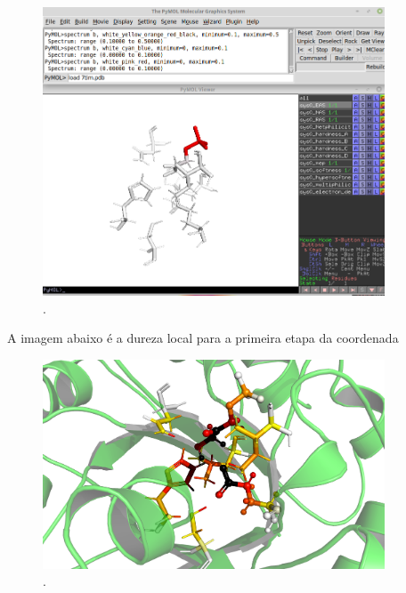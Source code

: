 \documentclass[a4paper,11pt]{refart}
\begin{document}
\hspace*{-\leftmarginwidth}
\begin{minipage}{\fullwidth}
	\begin{figure}[H]
		\begin{center}
			\includegraphics[width=4in]{images/tut6_img8}
			\caption{.}
			\label{fig_tut6_7}
		\end{center}
	\end{figure}
\end{minipage}

A imagem abaixo é a dureza local para a primeira etapa da coordenada


\hspace*{-\leftmarginwidth}
\begin{minipage}{\fullwidth}
	\begin{figure}[H]
		\begin{center}
			\includegraphics[width=4in]{images/tut6_img9}
			\caption{.}
			\label{fig_tut6_8}
		\end{center}
	\end{figure}
\end{minipage}
\end{document}
